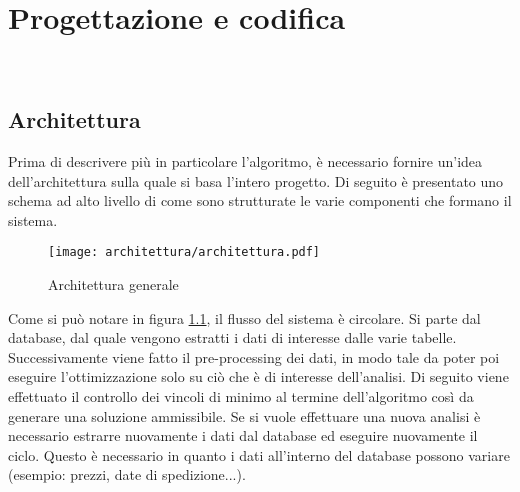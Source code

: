 
\chapter{Progettazione e codifica}
\label{cap:progettazione-codifica}

\noindent {}\\

\section{Architettura}
\label{sec:progettazione}
\noindent Prima di descrivere più in particolare l'algoritmo, è necessario
fornire un’idea dell’architettura sulla quale si basa l'intero progetto.
Di seguito è presentato uno schema ad alto livello di come sono strutturate le varie
componenti che formano il sistema.

\begin{figure}[!h] 
    \centering 
    \texttt{[image: architettura/architettura.pdf]} 
    \caption{Architettura generale}
    \label{architettura-generale}
\end{figure}

\noindent Come si può notare in figura \ref{architettura-generale},
il flusso del sistema è circolare.
Si parte dal database, dal quale vengono estratti i dati di interesse dalle varie
tabelle. Successivamente viene fatto il pre-processing dei dati,
in modo tale da poter poi eseguire l'ottimizzazione solo su
ciò che è di interesse dell'analisi.
Di seguito viene effettuato il controllo dei vincoli di minimo al termine
dell'algoritmo così da generare
una soluzione ammissibile. Se si vuole effettuare una nuova
analisi è necessario estrarre nuovamente i dati dal
database ed eseguire nuovamente il ciclo. Questo è necessario
in quanto i dati all'interno del database possono variare
(esempio: prezzi, date di spedizione...).

\newpage


